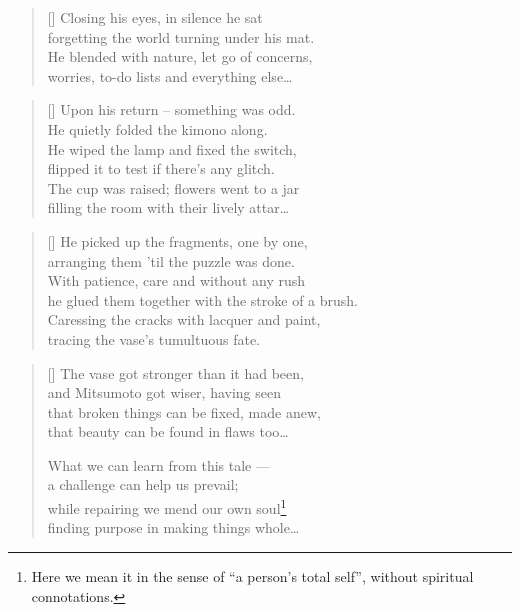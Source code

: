 \begin{multicols}{2}
	\begin{verse}[\versewidth]
		Closing his eyes, in silence he sat\\
		forgetting the world turning under his mat.\\
		He blended with nature, let go of concerns,\\
		worries, to-do lists and everything else\ldots
	\end{verse}
	
	\begin{verse}[\versewidth]
		Upon his return -- something was odd.\\
		He quietly folded the kimono along.\\
		He wiped the lamp and fixed the switch,\\
		flipped it to test if there's any glitch.\\
		The cup was raised; flowers went to a jar\\
		filling the room with their lively attar\ldots
	\end{verse}
	
	
	\begin{verse}[\versewidth]
		He picked up the fragments, one by one,\\
		arranging them 'til the puzzle was done.\\
		With patience, care and without any rush\\
		he glued them together with the stroke of a brush.\\
		
		Caressing the cracks with lacquer and paint,\\
		tracing the vase's tumultuous fate.

	\end{verse}
	
	
	\begin{verse}[\versewidth]
		The vase got stronger than it had been,\\
		and Mitsumoto got wiser, having seen\\
		that broken things can be fixed, made anew,\\
		that beauty can be found in flaws too\ldots
		
		What we can learn from this tale ---\\
		a challenge can help us prevail;\\
		while repairing we mend our own soul\footnote{Here we mean it in the sense of ``a person's total self'', without spiritual connotations.}\\
		finding purpose in making things whole\ldots
	\end{verse}
	
	
\end{multicols}




